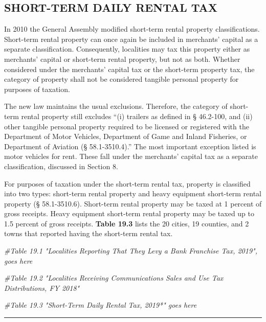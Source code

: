 \documentclass[
]{book}
\newenvironment{Shaded}{\begin{snugshade}}{\end{snugshade}}
\newcommand{\CommentTok}[1]{\textcolor[rgb]{0.56,0.35,0.01}{\textit{#1}}}
\begin{document}
\hypertarget{short-term-daily-rental-tax}{%
\subsection{SHORT-TERM DAILY RENTAL TAX}\label{short-term-daily-rental-tax}}

In 2010 the General Assembly modified short-term rental property classifications. Short-term rental property can once again be included in merchants' capital as a separate classification. Consequently, localities may tax this property either as merchants' capital or short-term rental property, but not as both. Whether considered under the merchants' capital tax or the short-term property tax, the category of property shall not be considered tangible personal property for purposes of taxation.

The new law maintains the usual exclusions. Therefore, the category of short-term rental property still excludes ``(i) trailers as defined in § 46.2-100, and (ii) other tangible personal property required to be licensed or registered with the Department of Motor Vehicles, Department of Game and Inland Fisheries, or Department of Aviation (§ 58.1-3510.4).'' The most important exception listed is motor vehicles for rent. These fall under the merchants' capital tax as a separate classification, discussed in Section 8.

For purposes of taxation under the short-term rental tax, property is classified into two types: short-term rental property and heavy equipment short-term rental property (§ 58.1-3510.6). Short-term rental property may be taxed at 1 percent of gross receipts. Heavy equipment short-term rental property may be taxed up to 1.5 percent of gross receipts. \textbf{Table 19.3} lists the 20 cities, 19 counties, and 2 towns that reported having the short-term rental tax.

\begin{Shaded}
\begin{Highlighting}[]
\CommentTok{\#Table 19.1 "Localities Reporting That They Levy a Bank Franchise Tax, 2019", goes here}

\CommentTok{\#Table 19.2 "Localities Receiving Communications Sales and Use Tax Distributions, FY 2018"}

\CommentTok{\#Table 19.3 "Short{-}Term Daily Rental Tax, 2019*" goes here}
\end{Highlighting}
\end{Shaded}

\begin{center}\rule{0.5\linewidth}{0.5pt}\end{center}
\end{document}
